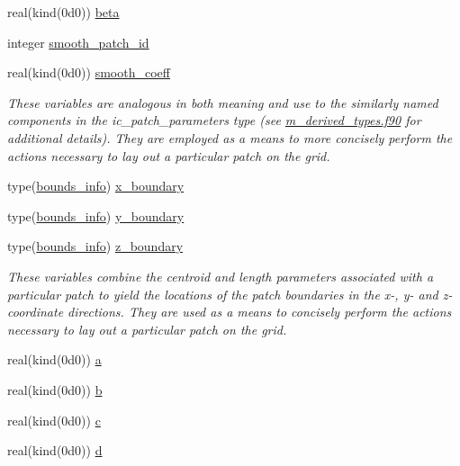 \begin{DoxyCompactItemize}
\item 
real(kind(0d0)) \hyperlink{namespacem__initial__condition_aa61b446189c2c88bb9261649f4b594b3}{beta}
\item 
integer \hyperlink{namespacem__initial__condition_adf36787dd781f2f28d1b49d06116c401}{smooth\+\_\+patch\+\_\+id}
\item 
real(kind(0d0)) \hyperlink{namespacem__initial__condition_a7ab7ae2808ac3b52319477860c6dbf80}{smooth\+\_\+coeff}
\begin{DoxyCompactList}\small\item\em These variables are analogous in both meaning and use to the similarly named components in the ic\+\_\+patch\+\_\+parameters type (see \hyperlink{m__derived__types_8f90}{m\+\_\+derived\+\_\+types.\+f90} for additional details). They are employed as a means to more concisely perform the actions necessary to lay out a particular patch on the grid. \end{DoxyCompactList}\item 
type(\hyperlink{structm__derived__types_1_1bounds__info}{bounds\+\_\+info}) \hyperlink{namespacem__initial__condition_abcd86e737c47247631a1fb95c1764b00}{x\+\_\+boundary}
\item 
type(\hyperlink{structm__derived__types_1_1bounds__info}{bounds\+\_\+info}) \hyperlink{namespacem__initial__condition_ab669c9fbfa80cdc9139ea45f293b7f49}{y\+\_\+boundary}
\item 
type(\hyperlink{structm__derived__types_1_1bounds__info}{bounds\+\_\+info}) \hyperlink{namespacem__initial__condition_aaae7053fde0b060e39db9f943f000389}{z\+\_\+boundary}
\begin{DoxyCompactList}\small\item\em These variables combine the centroid and length parameters associated with a particular patch to yield the locations of the patch boundaries in the x-\/, y-\/ and z-\/coordinate directions. They are used as a means to concisely perform the actions necessary to lay out a particular patch on the grid. \end{DoxyCompactList}\item 
real(kind(0d0)) \hyperlink{namespacem__initial__condition_a8a559b4d7a1e1e69f5e3b9ea0474e3fa}{a}
\item 
real(kind(0d0)) \hyperlink{namespacem__initial__condition_a0932a1bcb9b0293f1368e204a8fda4b9}{b}
\item 
real(kind(0d0)) \hyperlink{namespacem__initial__condition_a03d80b7b8ee41e5b16d996b46a605706}{c}
\item 
real(kind(0d0)) \hyperlink{namespacem__initial__condition_af692b3658ab0d7bcda937394fe3e2903}{d}

\end{DoxyCompactItemize}
